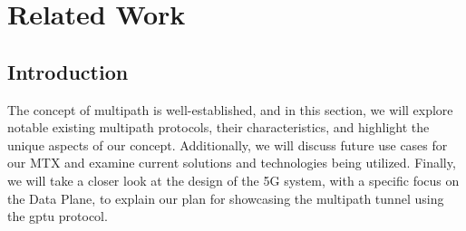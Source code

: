 \cleardoublepage\chapter{Related Work}\label{sec:related_work}\minitoc\vspace{.5cm}

\section{Introduction}



The concept of multipath is well-established, and in this section, we will explore notable existing multipath protocols, their characteristics, and highlight the unique aspects of our concept. 
Additionally, we will discuss future use cases for our \ac{MTX} and examine current solutions and technologies being utilized. 
Finally, we will take a closer look at the design of the 5G system, with a specific focus on the Data Plane, to explain our plan for showcasing the multipath tunnel using the \ac{gptu} protocol.

